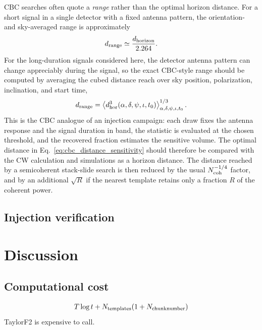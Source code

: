 \documentclass[aps,prd,amsmath,floats,floatfix, twocolumn,
superscriptaddress,nofootinbib,showpacs]{revtex4-2}
\begin{document}
CBC searches often quote a \emph{range} rather than the optimal horizon
distance.  For a short signal in a single detector with a fixed antenna pattern,
the orientation- and sky-averaged range is approximately
\begin{equation}
    d_{\rm range} \simeq \frac{d_{\rm horizon}}{2.264}.
    \label{eq:cbc_range_short_signal}
\end{equation}
For the long-duration signals considered here, the detector antenna pattern can
change appreciably during the signal, so the exact CBC-style range should be
computed by averaging the cubed distance reach over sky position, polarization,
inclination, and start time,
\begin{equation}
    d_{\rm range}
    =
    \left\langle
    d_{\rm hor}^3(\alpha,\delta,\psi,\iota,t_0)
    \right\rangle_{\alpha,\delta,\psi,\iota,t_0}^{1/3}.
    \label{eq:long_signal_range}
\end{equation}
This is the CBC analogue of an injection campaign: each draw fixes the antenna
response and the signal duration in band, the statistic is evaluated at the
chosen threshold, and the recovered fraction estimates the sensitive volume.
The optimal distance in Eq.~\eqref{eq:cbc_distance_sensitivity} should
therefore be compared with the CW calculation and simulations as a horizon
distance.  The distance reached by a semicoherent stack-slide search is then
reduced by the usual $N_{\rm coh}^{-1/4}$ factor, and by an additional
$\sqrt{R}$ if the nearest template retains only a fraction $R$ of the coherent
power.

\subsection{Injection verification}




\section{Discussion}
\label{sec:discussion}


\subsection{Computational cost}
\begin{gather}
    T \log t + N_{\rm templates}(1+N_{\rm chunk number})
\end{gather}
TaylorF2 is expensive to call. 
\end{document}
